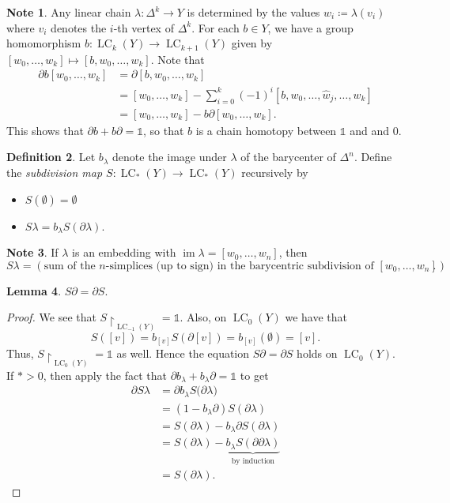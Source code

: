 \documentclass[10pt,letterpaper,cm]{nupset}
\theoremstyle{definition}
\newtheorem{definition}{Definition}[subsection]
\newtheorem{note}[definition]{Note}
\theoremstyle{theorem}
\newtheorem{lemma}[definition]{Lemma}
\theoremstyle{remark}
\newcommand{\1}{\mathbb{1}}
\newcommand{\0}{\vec 0}
\DeclareMathOperator{\im}{im}
\DeclareMathOperator{\lc}{\mathrm{LC}}
\begin{document}
\begin{note}
Any linear chain $\lambda: \Delta^k \to Y$ is determined by the values $w_i \coloneqq  \lambda(v_i)$ where $v_i$ denotes the $i$-th vertex of $\Delta^k$. For each $b\in Y$, we have a group homomorphism $b: \lc_k(Y) \to \lc_{k+1}(Y)$ given by $\left[w_0, \ldots, w_k\right] \mapsto \left[b, w_0, \ldots, w_k\right]$. Note that 
\begin{align*} \partial{b[w_0, \ldots, w_k]} & =  \partial{[b, w_0, \ldots, w_k]}
\\ & = \left[w_0, \ldots, w_k\right] - \sum_{i=0}^k ({-1})^i\left[b, w_0, \ldots, \hat{w}_j, \ldots, w_k\right]
\\ & = \left[w_0, \ldots, w_k\right] - b{\partial{[w_0, \ldots, w_k]}}.
\end{align*}
This shows that $\partial{b} + b{\partial} =\1$, so that $b$ is a chain homotopy between $\1$ and and $0$.
\end{note}

\begin{definition}
Let $b_{\lambda}$ denote the image under $\lambda$ of the barycenter of $\Delta^n$. Define the \textit{subdivision map $S: \lc_{\ast}(Y) \to \lc_{\ast}(Y)$} recursively by
\begin{itemize}
\item $S(\emptyset) = \emptyset$
\item $S\lambda= b_{\lambda}{S(\partial{\lambda})}.$
\end{itemize}
\end{definition}

\begin{note}
If $\lambda$ is an embedding with $\im{\lambda} = \left[w_0, \ldots, w_n\right]$, then $$S\lambda = \left(\text{sum of the }n\text{-simplices (up to sign) in the barycentric subdivision of }\left[w_0, \ldots, w_n\right]\right).$$
\end{note}

\begin{lemma}
$S{\partial} = \partial{S}$.
\end{lemma}
\begin{proof}
We see that $S\restriction_{\lc_{-1}(Y)} = \1$. Also, on $\lc_0(Y)$ we have that $$S([v]) = b_{[v]}S(\partial{[v]}) =b_{[v]}(\emptyset) =[v] .$$ Thus, $S\restriction_{\lc_0(Y)} =\1$ as well. Hence the equation $S{\partial} = \partial{S}$ holds on $\lc_0(Y)$. If ${\ast}>0$, then apply the fact that $\partial{b_{\lambda}} + b_{\lambda}{\partial} = \1$ to get
\begin{align*}
 \partial{S\lambda} & = \partial{b_{\lambda}S(\partial{\lambda}})
 \\ & =  (1- b_{\lambda}{\partial})S(\partial{\lambda})
 \\ & = S(\partial{\lambda}) -b_{\lambda}\partial{S(\partial{\lambda})}
 \\ & = S(\partial{\lambda}) - \underbrace{b_{\lambda}S(\partial{\partial{\lambda}})}_{\text{by induction}}
 \\ & = S(\partial{\lambda}) .
\end{align*}
\end{proof}
\end{document}
